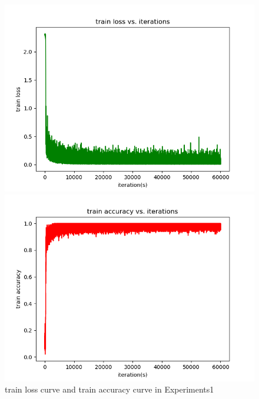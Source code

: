 \documentclass{elegantbook}
\begin{document}
\begin{figure}[!h]
	\centering
	\begin{minipage}[t]{0.48\textwidth}
		\centering
		\includegraphics[width=\textwidth]{../results/trainloss1}
	\end{minipage}
	\begin{minipage}[t]{0.48\textwidth}
		\centering
		\includegraphics[width=\textwidth]{../results/trainacc1}
	\end{minipage}
	\caption{\label{trainres1}train loss curve and train accuracy curve in Experiments1}
\end{figure}
\end{document}
